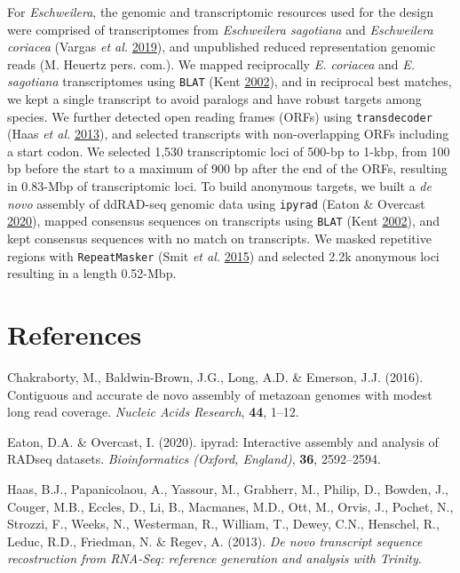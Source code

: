 \documentclass[12pt,]{article}
\begin{document}
For \emph{Eschweilera}, the genomic and transcriptomic resources used for the design were comprised of transcriptomes from \emph{Eschweilera sagotiana} and \emph{Eschweilera coriacea} (Vargas \emph{et al.} \protect\hyperlink{ref-Vargas2019}{2019}), and unpublished reduced representation genomic reads (M. Heuertz pers. com.).
We mapped reciprocally \emph{E. coriacea} and \emph{E. sagotiana} transcriptomes using \texttt{BLAT} (Kent \protect\hyperlink{ref-Kent2002}{2002}), and in reciprocal best matches, we kept a single transcript to avoid paralogs and have robust targets among species.
We further detected open reading frames (ORFs) using \texttt{transdecoder} (Haas \emph{et al.} \protect\hyperlink{ref-Haas2013}{2013}),
and selected transcripts with non-overlapping ORFs including a start codon.
We selected 1,530 transcriptomic loci of 500-bp to 1-kbp, from 100 bp before the start to a maximum of 900 bp after the end of the ORFs, resulting in 0.83-Mbp of transcriptomic loci.
To build anonymous targets, we built a \emph{de novo} assembly of ddRAD-seq genomic data using \texttt{ipyrad} (Eaton \& Overcast \protect\hyperlink{ref-Eaton2020}{2020}), mapped consensus sequences on transcripts using \texttt{BLAT} (Kent \protect\hyperlink{ref-Kent2002}{2002}), and kept consensus sequences with no match on transcripts.
We masked repetitive regions with \texttt{RepeatMasker} (Smit \emph{et al.} \protect\hyperlink{ref-Smit2015}{2015}) and selected 2.2k anonymous loci resulting in a length 0.52-Mbp.

\newpage

\hypertarget{references}{%
\section{References}\label{references}}

\hypertarget{refs}{}
\leavevmode\hypertarget{ref-Chakraborty2016}{}%
Chakraborty, M., Baldwin-Brown, J.G., Long, A.D. \& Emerson, J.J. (2016). Contiguous and accurate de novo assembly of metazoan genomes with modest long read coverage. \emph{Nucleic Acids Research}, \textbf{44}, 1--12.

\leavevmode\hypertarget{ref-Eaton2020}{}%
Eaton, D.A. \& Overcast, I. (2020). ipyrad: Interactive assembly and analysis of RADseq datasets. \emph{Bioinformatics (Oxford, England)}, \textbf{36}, 2592--2594.

\leavevmode\hypertarget{ref-Haas2013}{}%
Haas, B.J., Papanicolaou, A., Yassour, M., Grabherr, M., Philip, D., Bowden, J., Couger, M.B., Eccles, D., Li, B., Macmanes, M.D., Ott, M., Orvis, J., Pochet, N., Strozzi, F., Weeks, N., Westerman, R., William, T., Dewey, C.N., Henschel, R., Leduc, R.D., Friedman, N. \& Regev, A. (2013). \emph{De novo transcript sequence recostruction from RNA-Seq: reference generation and analysis with Trinity}.
\end{document}

